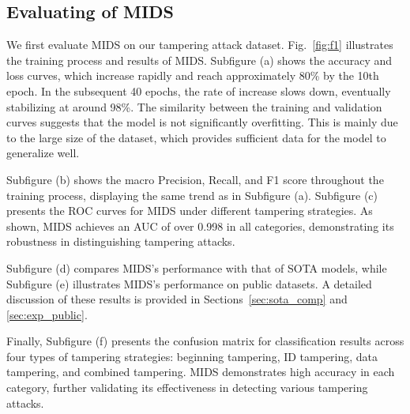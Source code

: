 \documentclass[lettersize,journal]{IEEEtran}
\begin{document}
\subsection{Evaluating of MIDS} 
\label{sec:mids_exp}
We first evaluate MIDS on our tampering attack dataset. Fig.~\ref{fig:f1} illustrates the training process and results of MIDS. Subfigure (a) shows the accuracy and loss curves, which increase rapidly and reach approximately 80\% by the 10th epoch. In the subsequent 40 epochs, the rate of increase slows down, eventually stabilizing at around 98\%. The similarity between the training and validation curves suggests that the model is not significantly overfitting. This is mainly due to the large size of the dataset, which provides sufficient data for the model to generalize well.

Subfigure (b) shows the macro Precision, Recall, and F1 score throughout the training process, displaying the same trend as in Subfigure (a). Subfigure (c) presents the ROC curves for MIDS under different tampering strategies. As shown, MIDS achieves an AUC of over 0.998 in all categories, demonstrating its robustness in distinguishing tampering attacks.

Subfigure (d) compares MIDS's performance with that of SOTA models, while Subfigure (e) illustrates MIDS's performance on public datasets. A detailed discussion of these results is provided in Sections~\ref{sec:sota_comp} and \ref{sec:exp_public}.

Finally, Subfigure (f) presents the confusion matrix for classification results across four types of tampering strategies: beginning tampering, ID tampering, data tampering, and combined tampering. MIDS demonstrates high accuracy in each category, further validating its effectiveness in detecting various tampering attacks.


\end{document}
